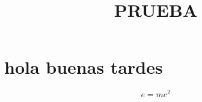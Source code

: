 \documentclass[10pt, a4paper, twocolumn]{article}
\title{PRUEBA}
\begin{document}
\maketitle
\section{hola buenas tardes}
\blindtext 

\begin{equation}
\label{eq:emc}
e = mc^2
\end{equation}

\blindtext
\end{document}
